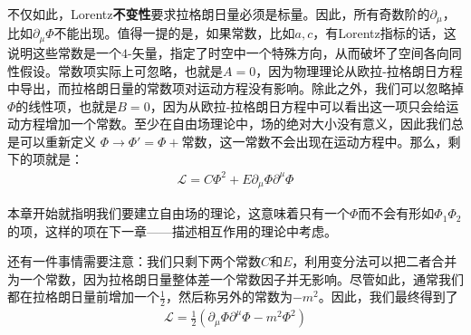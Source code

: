 不仅如此，Lorentz{\bfseries 不变性}要求拉格朗日量必须是标量。因此，所有奇数阶的$\partial_\mu$，比如$\partial_\mu\Phi$不能出现。值得一提的是，如果常数，比如$a, c$，有Lorentz指标的话，这说明这些常数是一个$4$-矢量，指定了时空中一个特殊方向，从而破坏了空间各向同性假设。常数项实际上可忽略，也就是$A=0$，因为物理理论从欧拉-拉格朗日方程中导出，而拉格朗日量的常数项对运动方程没有影响。除此之外，我们可以忽略掉$\Phi$的线性项，也就是$B=0$，因为从欧拉-拉格朗日方程中可以看出这一项只会给运动方程增加一个常数。至少在自由场理论中，场的绝对大小没有意义，因此我们总是可以重新定义 $\Phi \rightarrow \Phi' = \Phi + \text{常数}$，这一常数不会出现在运动方程中。那么，剩下的项就是：
\begin{align}
\label{equ6.3}
\mathscr{L}=C\Phi^2+E\partial_\mu\Phi\partial^\mu\Phi
\end{align}

本章开始就指明我们要建立自由场的理论，这意味着只有一个$\Phi$而不会有形如$\Phi_1\Phi_2$的项，这样的项在下一章——描述相互作用的理论中考虑。

还有一件事情需要注意：我们只剩下两个常数$C$和$E$，利用变分法可以把二者合并为一个常数，因为拉格朗日量整体差一个常数因子并无影响。尽管如此，通常我们都在拉格朗日量前增加一个$\frac{1}{2}$，然后称另外的常数为$-m^2$。因此，我们最终得到了
\begin{align}
\label{equ6.4}
\mathscr{L}=\frac{1}{2}(\partial_\mu\Phi\partial^\mu\Phi-m^2\Phi^2)
\end{align}


